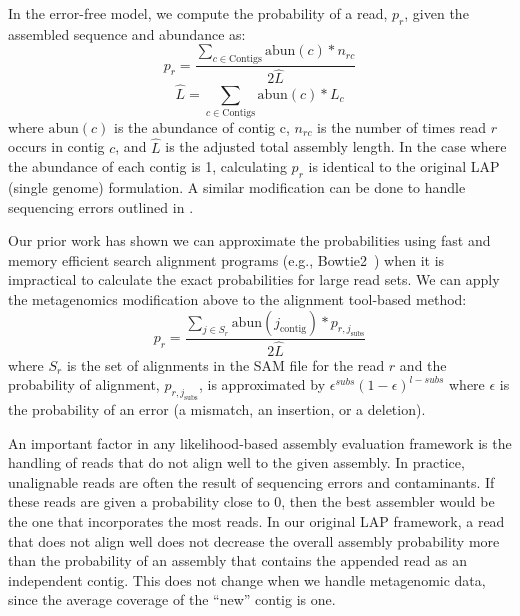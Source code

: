 In the error-free model, we compute the probability of a read, $p_r$, given the assembled sequence and abundance as:
%
\begin{equation}
  \label{meta_read_probability}
  p_r = \frac{\sum_{c \in \text{Contigs}}\text{abun}(c)*n_{rc}}{2\hat{L}}
\end{equation}
%
\begin{equation}
  \label{meta_read_length}
  \hat{L} = \sum_{c \in \text{Contigs}}\text{abun}(c)*L_{c}
\end{equation}
%
where $\text{abun}(c)$ is the abundance of contig c, $n_{rc}$ is the number of times read $r$ occurs in contig $c$, and $\hat{L}$ is the adjusted total assembly length.  In the case where the abundance of each contig is 1, calculating $p_r$ is identical to the original LAP (single genome) formulation.  A similar modification can be done to handle sequencing errors outlined in \cite{LAP}.

Our prior work has shown we can approximate the probabilities using fast and memory efficient search alignment programs (e.g., Bowtie2~\cite{langmead2012fast}) when it is impractical to calculate the exact probabilities for large read sets.
We can apply the metagenomics modification above to the alignment tool-based method:
%
\begin{equation}
\label{}
p_{r} = \frac{\sum_{j \in S_r} \text{abun}(j_{\text{contig}})*p_{r,j_{\text{subs}}}}{2\hat{L}}
\end{equation}
where $S_r$ is the set of alignments in the SAM file for the read $r$ and the probability of alignment, $p_{r,j_{\text{subs}}}$, is approximated by $\epsilon^{subs}(1 - \epsilon)^{l - subs}$ where $\epsilon$ is the probability of an error (a mismatch, an insertion, or a deletion).




An important factor in any likelihood-based assembly evaluation framework is the handling of reads that do not align well to the given assembly.
In practice, unalignable reads are often the result of sequencing errors and contaminants.
If these reads are given a probability close to 0, then the best assembler would be the one that incorporates the most reads.
In our original LAP framework, a read that does not align well does not decrease the overall assembly probability more than the probability of an assembly that contains the appended read as an independent contig.
This does not change when we handle metagenomic data, since the average coverage of the ``new'' contig is one.

